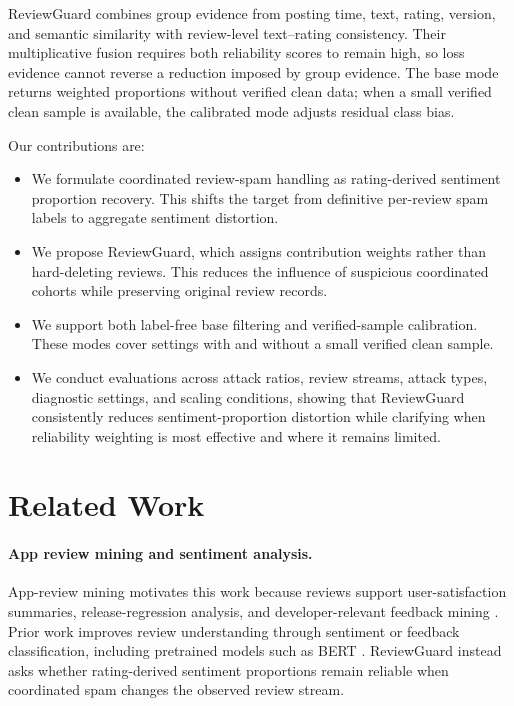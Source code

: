 \documentclass[runningheads]{llncs}
\begin{document}
ReviewGuard combines group evidence from posting time, text, rating, version, and semantic similarity with review-level text--rating consistency. Their multiplicative fusion requires both reliability scores to remain high, so loss evidence cannot reverse a reduction imposed by group evidence. The base mode returns weighted proportions without verified clean data; when a small verified clean sample is available, the calibrated mode adjusts residual class bias.

Our contributions are:
\begin{itemize}
    \item We formulate coordinated review-spam handling as rating-derived sentiment proportion recovery. This shifts the target from definitive per-review spam labels to aggregate sentiment distortion.
    \item We propose ReviewGuard, which assigns contribution weights rather than hard-deleting reviews. This reduces the influence of suspicious coordinated cohorts while preserving original review records.
    \item We support both label-free base filtering and verified-sample calibration. These modes cover settings with and without a small verified clean sample.
    \item We conduct evaluations across attack ratios, review streams, attack types, diagnostic settings, and scaling conditions, showing that ReviewGuard consistently reduces sentiment-proportion distortion while clarifying when reliability weighting is most effective and where it remains limited.
\end{itemize}

\section{Related Work}

\paragraph{App review mining and sentiment analysis.}
App-review mining motivates this work because reviews support user-satisfaction summaries, release-regression analysis, and developer-relevant feedback mining \cite{pagano2013user,guzman2014users,maalej2016automatic,hadi2023evaluating,mukherjee2020security}. Prior work improves review understanding through sentiment or feedback classification, including pretrained models such as BERT \cite{devlin2019bert}. ReviewGuard instead asks whether rating-derived sentiment proportions remain reliable when coordinated spam changes the observed review stream.
\end{document}
